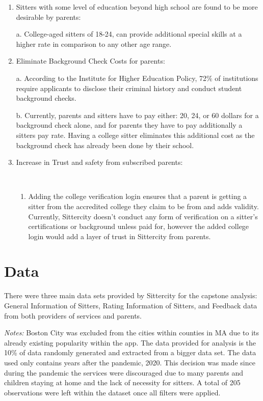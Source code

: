 \documentclass[12pt]{article}
\providecommand{\tightlist}{%
  \setlength{\itemsep}{0pt}\setlength{\parskip}{0pt}}
\begin{document}
\begin{enumerate}
\def\labelenumi{\arabic{enumi}.}
\item
  Sitters with some level of education beyond high school are found to
  be more desirable by parents:

  a. College-aged sitters of 18-24, can provide additional special
  skills at a higher rate in comparison to any other age range.\\
\item
  Eliminate Background Check Costs for parents:

  a. According to the Institute for Higher Education Policy, 72\% of
  institutions require applicants to disclose their criminal history and
  conduct student background checks.

  b. Currently, parents and sitters have to pay either: 20, 24, or 60
  dollars for a background check alone, and for parents they have to pay
  additionally a sitters pay rate. Having a college sitter eliminates
  this additional cost as the background check has already been done by
  their school.
\item
  Increase in Trust and safety from subscribed parents:\\
  \strut \\

  \begin{enumerate}
  \def\labelenumii{\alph{enumii}.}
  \tightlist
  \item
    Adding the college verification login ensures that a parent is
    getting a sitter from the accredited college they claim to be from
    and adds validity. Currently, Sittercity doesn't conduct any form of
    verification on a sitter's certifications or background unless paid
    for, however the added college login would add a layer of trust in
    Sittercity from parents.
  \end{enumerate}
\end{enumerate}

\hypertarget{data}{%
\section{\texorpdfstring{\textbf{Data}}{Data}}\label{data}}

There were three main data sets provided by Sittercity for the capstone
analysis: General Information of Sitters, Rating Information of Sitters,
and Feedback data from both providers of services and parents.

\emph{Notes:} Boston City was excluded from the cities within counties
in MA due to its already existing popularity within the app. The data
provided for analysis is the 10\% of data randomly generated and
extracted from a bigger data set. The data used only contains years
after the pandemic, 2020. This decision was made since during the
pandemic the services were discouraged due to many parents and children
staying at home and the lack of necessity for sitters. A total of 205
observations were left within the dataset once all filters were applied.
\end{document}

